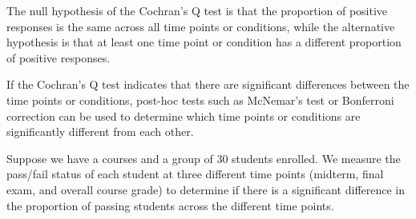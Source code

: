 \documentclass[
]{ctexart}
\begin{document}
The null hypothesis of the Cochran's Q test is that the proportion of
positive responses is the same across all time points or conditions,
while the alternative hypothesis is that at least one time point or
condition has a different proportion of positive responses.

If the Cochran's Q test indicates that there are significant differences
between the time points or conditions, post-hoc tests such as McNemar's
test or Bonferroni correction can be used to determine which time points
or conditions are significantly different from each other.

Suppose we have a courses and a group of 30 students enrolled. We
measure the pass/fail status of each student at three different time
points (midterm, final exam, and overall course grade) to determine if
there is a significant difference in the proportion of passing students
across the different time points.
\end{document}
